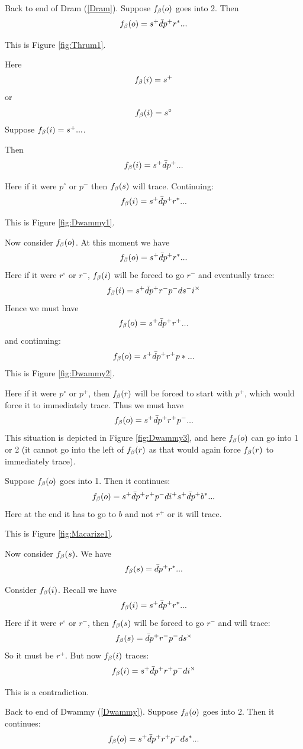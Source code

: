 


\label{Thrum}
Back to end of Dram (\ref{Dram}). Suppose $f_\beta(o)$ goes into 2. Then
\[
f_\beta(o) = s^+ \bar{d} p^+ r^*...
\]

This is Figure \ref{fig:Thrum1}.

Here 
\[
f_\beta(i) = s^+
\]
or
\[
f_\beta(i) = s^\circ
\]
 \label{Dwammy}
Suppose $f_\beta(i) = s^+...$.

Then
\[
f_\beta(i) = s^+ \bar{d} p^+...
\]

Here if it were $p^\circ$ or $p^-$ then $f_\beta(s)$ will trace. Continuing:
\[
f_\beta(i) = s^+ \bar{d} p^+ r^*...
\]

This is Figure \ref{fig:Dwammy1}.

Now consider $f_\beta(o)$. At this moment we have
\[
f_\beta(o) = s^+ \bar{d} p^+ r^*...
\]
Here if it were $r^\circ$ or $r^-$, $f_\beta(i)$ will be forced to go $r^-$ and eventually trace:
\[
f_\beta(i) = s^+ \bar{d} p^+ r^- p^- d s^- i^\times
\]
Hence we must have 
\[
f_\beta(o) = s^+ \bar{d} p^+ r^+...
\]
and continuing:
\[
f_\beta(o) = s^+ \bar{d} p^+ r^+ p*...
\]
This is Figure \ref{fig:Dwammy2}.

Here if it were $p^\circ$ or $p^+$, then $f_\beta(r)$ will be forced to start with $p^+$, which would force it to immediately trace. Thus we must have
\[
f_\beta(o) = s^+ \bar{d} p^+ r^+ p^-...
\]
This situation is depicted in Figure \ref{fig:Dwammy3}, and here $f_\beta(o)$ can go into 1 or 2 (it cannot go into the left of $f_\beta(r)$ as that would again force $f_\beta(r)$ to immediately trace).

\label{Macarize}
Suppose $f_\beta(o)$ goes into 1. Then it continues:
\[
f_\beta(o) = s^+ \bar{d} p^+ r^+ p^- d i^+ s^+ \bar{d} p^+ b^*...
\]
Here at the end it has to go to $b$ and not $r^+$ or it will trace. 

This is Figure \ref{fig:Macarize1}.

Now consider $f_\beta(s)$. We have
\[
f_\beta(s) = \bar{d} p^+ r^*...
\]

Consider $f_\beta(i)$. Recall we have
\[
f_\beta(i) = s^+ \bar{d} p^+ r^*...
\]
Here if it were $r^\circ$ or $r^-$, then $f_\beta(s)$ will be forced to go $r^-$ and will trace:
\[
f_\beta(s) = \bar{d} p^+ r^- p^- d s^\times
\]
So it must be $r^+$. But now $f_\beta(i)$ traces:
\[
f_\beta(i) = s^+ \bar{d} p^+ r^+ p^- d i^\times
\]

This is a contradiction.

\label{Mooncalf}
Back to end of Dwammy (\ref{Dwammy}). Suppose $f_\beta(o)$ goes into 2. Then it continues:
\[
f_\beta(o) = s^+ \bar{d} p^+ r^+ p^- d s^*...
\]

